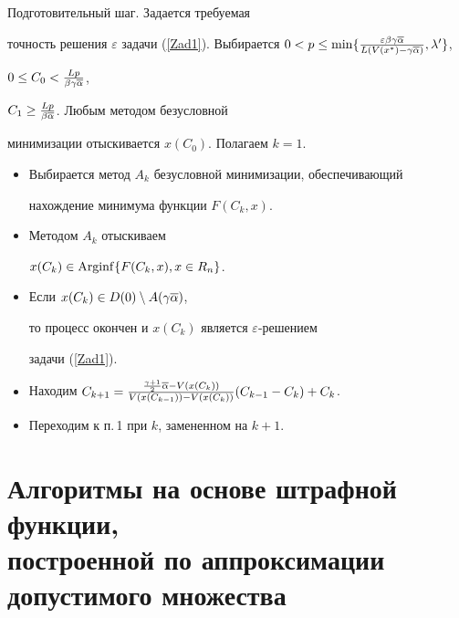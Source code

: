 \begin{alg}


Подготовительный шаг. Задается требуемая


точность решения $\varepsilon$ задачи (\ref{Zad1}). Выбирается $0<


p\leq\min\{\frac{\varepsilon\beta\gamma\o\alpha}


{L(V(x^*)-\gamma\o\alpha)},\lambda'\}$,


$0\leq C_0<\frac{Lp}{\beta\gamma\overline\alpha}$,


$C_1\geq\frac{Lp}{\beta\overline\alpha} $. Любым методом безусловной


минимизации отыскивается $x(C_0)$. Полагаем $k=1$.


\begin{itemize}


\item[1.] Выбирается метод $A_k$ безусловной минимизации, обеспечивающий


нахождение минимума функции $F(C_k,x)$.


\item[2.] Методом $A_k$ отыскиваем


$x(C_k) \in \operatorname{Arginf}\{F(C_k,x),x\in R_n\}$.


\item[3.] Если $x(C_k)\in D(0)\setminus A(\gamma \overline\alpha)$, 


то процесс окончен и $x(C_k)$ является $\varepsilon$-решением 


задачи (\ref{Zad1}).


\item[4.] Находим $C_{k+1}=\frac{\frac{\gamma+1}{2}\o\alpha-V(x(C_k))} 


{V(x(C_{k-1}))-V(x(C_k))}(C_{k-1}-C_k)+C_k$.


\item[5.] Переходим к п.\,1 при $k$, замененном на $k+1$.


\end{itemize}


\end{alg}








\section{Алгоритмы на основе штрафной функции,\protect\\


построенной по аппроксимации допустимого множества}








